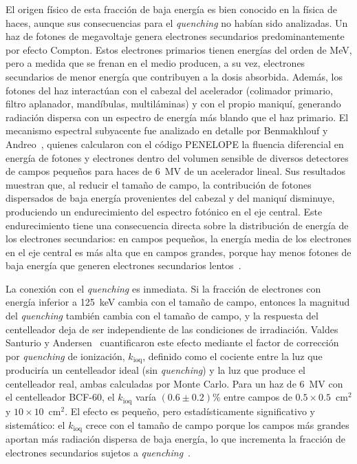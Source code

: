 \documentclass[11pt,a4paper]{article}
\begin{document}
El origen físico de esta fracción de baja energía es bien conocido en la física de haces, aunque sus consecuencias para el \textit{quenching} no habían sido analizadas. Un haz de fotones de megavoltaje genera electrones secundarios predominantemente por efecto Compton. Estos electrones primarios tienen energías del orden de MeV, pero a medida que se frenan en el medio producen, a su vez, electrones secundarios de menor energía que contribuyen a la dosis absorbida. Además, los fotones del haz interactúan con el cabezal del acelerador (colimador primario, filtro aplanador, mandíbulas, multiláminas) y con el propio maniquí, generando radiación dispersa con un espectro de energía más blando que el haz primario. El mecanismo espectral subyacente fue analizado en detalle por Benmakhlouf y Andreo~\cite{benmakhlouf2017}, quienes calcularon con el código PENELOPE la fluencia diferencial en energía de fotones y electrones dentro del volumen sensible de diversos detectores de campos pequeños para haces de 6~MV de un acelerador lineal. Sus resultados muestran que, al reducir el tamaño de campo, la contribución de fotones dispersados de baja energía provenientes del cabezal y del maniquí disminuye, produciendo un endurecimiento del espectro fotónico en el eje central. Este endurecimiento tiene una consecuencia directa sobre la distribución de energía de los electrones secundarios: en campos pequeños, la energía media de los electrones en el eje central es más alta que en campos grandes, porque hay menos fotones de baja energía que generen electrones secundarios lentos~\cite{benmakhlouf2017,palmans2018}.

La conexión con el \textit{quenching} es inmediata. Si la fracción de electrones con energía inferior a 125~keV cambia con el tamaño de campo, entonces la magnitud del \textit{quenching} también cambia con el tamaño de campo, y la respuesta del centelleador deja de ser independiente de las condiciones de irradiación. Valdes Santurio y Andersen~\cite{santurio2019} cuantificaron este efecto mediante el factor de corrección por \textit{quenching} de ionización, $k_{\mathrm{ioq}}$, definido como el cociente entre la luz que produciría un centelleador ideal (sin \textit{quenching}) y la luz que produce el centelleador real, ambas calculadas por Monte Carlo. Para un haz de 6~MV con el centelleador BCF-60, el $k_{\mathrm{ioq}}$ varía $(0{.}6 \pm 0{.}2)$\% entre campos de $0{.}5 \times 0{.}5$~cm$^{2}$ y $10 \times 10$~cm$^{2}$. El efecto es pequeño, pero estadísticamente significativo y sistemático: el $k_{\mathrm{ioq}}$ crece con el tamaño de campo porque los campos más grandes aportan más radiación dispersa de baja energía, lo que incrementa la fracción de electrones secundarios sujetos a \textit{quenching}~\cite{santurio2019}.
\end{document}
